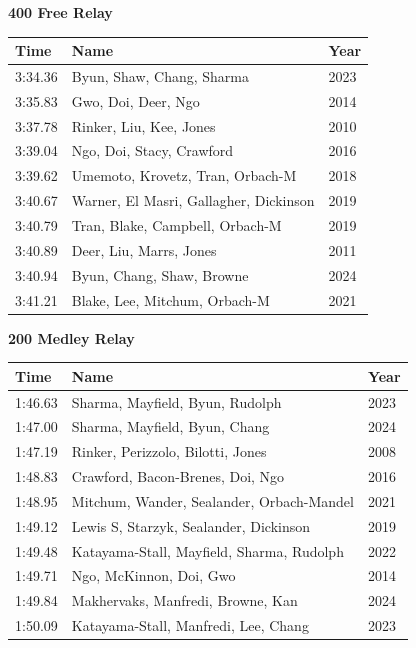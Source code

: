 \noindent\begin{minipage}[t]{0.98\textwidth}
\centering
\textbf{\textcolor{teamprimary}{400 Free Relay}}\par
\vspace{0.5em}
\centering
\small
\renewcommand{\arraystretch}{1.0}
\setlength{\tabcolsep}{4pt}
\begin{tabular}{@{}p{4.5cm}p{8.5cm}p{2.5cm}@{}}
\toprule
\textbf{Time} & \textbf{Name} & \textbf{Year} \\
\midrule
3:34.36 & Byun, Shaw, Chang, Sharma & 2023 \\
3:35.83 & Gwo, Doi, Deer, Ngo & 2014 \\
3:37.78 & Rinker, Liu, Kee, Jones & 2010 \\
3:39.04 & Ngo, Doi, Stacy, Crawford & 2016 \\
3:39.62 & Umemoto, Krovetz, Tran, Orbach-M & 2018 \\
3:40.67 & Warner, El Masri, Gallagher, Dickinson & 2019 \\
3:40.79 & Tran, Blake, Campbell, Orbach-M & 2019 \\
3:40.89 & Deer, Liu, Marrs, Jones & 2011 \\
3:40.94 & Byun, Chang, Shaw, Browne & 2024 \\
3:41.21 & Blake, Lee, Mitchum, Orbach-M & 2021 \\
\bottomrule
\end{tabular}
\end{minipage}
\vspace{1.2em}
\noindent\begin{minipage}[t]{0.98\textwidth}
\centering
\textbf{\textcolor{teamprimary}{200 Medley Relay}}\par
\vspace{0.5em}
\centering
\small
\renewcommand{\arraystretch}{1.0}
\setlength{\tabcolsep}{4pt}
\begin{tabular}{@{}p{4.5cm}p{8.5cm}p{2.5cm}@{}}
\toprule
\textbf{Time} & \textbf{Name} & \textbf{Year} \\
\midrule
1:46.63 & Sharma, Mayfield, Byun, Rudolph & 2023 \\
1:47.00 & Sharma, Mayfield, Byun, Chang & 2024 \\
1:47.19 & Rinker, Perizzolo, Bilotti, Jones & 2008 \\
1:48.83 & Crawford, Bacon-Brenes, Doi, Ngo & 2016 \\
1:48.95 & Mitchum, Wander, Sealander, Orbach-Mandel & 2021 \\
1:49.12 & Lewis S, Starzyk, Sealander, Dickinson & 2019 \\
1:49.48 & Katayama-Stall, Mayfield, Sharma, Rudolph & 2022 \\
1:49.71 & Ngo, McKinnon, Doi, Gwo & 2014 \\
1:49.84 & Makhervaks, Manfredi, Browne, Kan & 2024 \\
1:50.09 & Katayama-Stall, Manfredi, Lee, Chang & 2023 \\
\bottomrule
\end{tabular}
\end{minipage}
\clearpage
